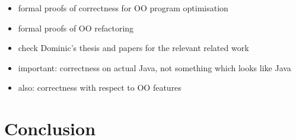 \documentclass[runningheads]{llncs}
\begin{document}
\begin{itemize}
\item formal proofs of correctness for OO program optimisation
\item formal proofs of OO refactoring
\item check Dominic’s thesis and papers for the relevant related work
\item important: correctness on actual Java, not something which looks like Java
\item also: correctness with respect to OO features
\end{itemize}

\section{Conclusion}

%




\end{document}
